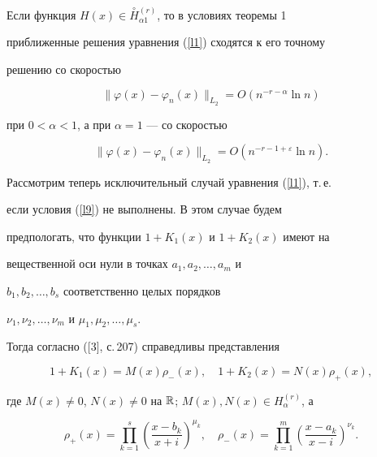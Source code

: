 \begin{cornonum}


Если функция $H(x) \in


\overset{\circ}{H}{}^{(r)}_{\alpha 1}$, то в условиях теоремы 1


приближенные решения уравнения (\ref{l1}) сходятся к его точному


решению со скоростью


$$


\|\varphi(x)-\varphi_n(x)\|_{L_2}=O(n^{-r-\alpha} \ln n)


$$


при $0<\alpha<1$, а при $\alpha=1$ --- со скоростью


$$


\|\varphi(x)-\varphi_n(x)\|_{L_2}=O(n^{-r-1+\varepsilon} \ln n).


$$


\end{cornonum}








Рассмотрим теперь исключительный случай уравнения (\ref{l1}), т.\,е.


если условия (\ref{l9}) не выполнены. В этом случае будем


предпологать, что функции $1+K_1(x)$ и $1+K_2(x)$ имеют на


вещественной оси нули в точках $a_1,a_2,\dotsc,a_m$ и


$b_1,b_2,\dotsc,b_s$ соответственно целых порядков


$\nu_1,\nu_2,\dotsc,\nu_m$ и $\mu_1,\mu_2,\dotsc,\mu_s$.


Тогда согласно ([3], с.\,207) справедливы представления


\begin{equation}


\label{l18} 1+K_1(x)=M(x)\rho_-(x), \quad 1+K_2(x)=N(x)\rho_+(x),


\end{equation}


где $M(x)\neq 0$, $N(x)\neq 0$ на $\Bbb R$; $M(x), N(x) \in


H_\alpha^{(r)}$, а




\begin{equation}


\label{l19}


\rho_+(x)=\prod\limits_{k=1}^s\left(\frac{x-b_k}{x+i}\right)^{\mu_k},


\quad


\rho_-(x)=\prod\limits_{k=1}^m\left(\frac{x-a_k}{x-i}\right)^{\nu_k}.


\end{equation}


